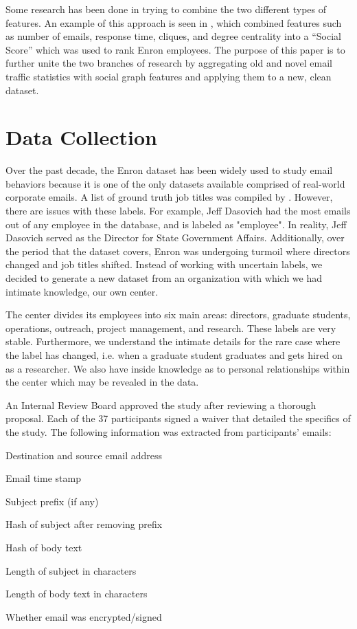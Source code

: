 \documentclass{article}
\begin{document}
\par
Some research has been done in trying to combine the two different types of features.  An example of this approach is seen in \cite{rowe_automated_2007}, which combined features such as number of emails, response time, cliques, and degree centrality into a ``Social Score'' which was used to rank Enron employees.  The purpose of this paper is to further unite the two branches of research by aggregating old and novel email traffic statistics with social graph features and applying them to a new, clean dataset.

\section{Data Collection} \label{Data Collection}
Over the past decade, the Enron dataset has been widely used to study email behaviors because it is one of the only datasets available comprised of real-world corporate emails.  A list of ground truth job titles was compiled by \cite{shetty_status_2004}.  However, there are issues with these labels.  For example, Jeff Dasovich had the most emails out of any employee in the database, and is labeled as "employee".  In reality, Jeff Dasovich served as the Director for State Government Affairs. Additionally, over the period that the dataset covers, Enron was undergoing turmoil where directors changed and job titles shifted.  Instead of working with uncertain labels, we decided to generate a new dataset from an organization with which we had intimate knowledge, our own center.  
\par
The center divides its employees into six main areas: directors, graduate students, operations, outreach, project management, and research.  These labels are very stable.  Furthermore, we understand the intimate details for the rare case where the label has changed, i.e. when a graduate student graduates and gets hired on as a researcher. We also have inside knowledge as to personal relationships within the center which may be revealed in the data.
\par 
An Internal Review Board approved the study after reviewing a thorough proposal.  Each of the 37 participants signed a waiver that detailed the specifics of the study.   The following information was extracted from participants' emails:  
\begin{compactitem}
\item Destination and source email address
\item Email time stamp
\item Subject prefix (if any)
\item Hash of subject after removing prefix
\item Hash of body text
\item Length of subject in characters
\item Length of body text in characters
\item Whether email was encrypted/signed
\end{compactitem}
\end{document}
